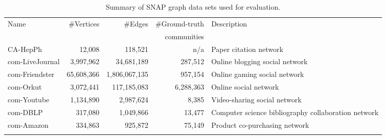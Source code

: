 \begin{table*}
  \centering
  \begin{tabular}{l r r r l}
    Name            & \#Vertices &       \#Edges & \#Ground-truth & Description \\
                    &            &               & communities    &             \\
    \hline
    CA-HepPh        &    12,008  &    118,521    & n/a            & Paper citation network \\
    com-LiveJournal &  3,997,962 &    34,681,189 & 287,512        & Online blogging social network \\
    com-Friendster  & 65,608,366 & 1,806,067,135 & 957,154        & Online gaming social network \\
    com-Orkut       &  3,072,441 &   117,185,083 & 6,288,363      & Online social network \\
    com-Youtube     &  1,134,890 &     2,987,624 & 8,385          & Video-sharing social network \\
    com-DBLP        &    317,080 &     1,049,866 & 13,477         & Computer science bibliography collaboration network \\
    com-Amazon      &    334,863 &       925,872 & 75,149         & Product co-purchasing network \\
    \hline
    \\[-1ex]
  \end{tabular}
  \caption{Summary of SNAP graph data sets used for evaluation.}
  \label{table-snap}
\end{table*}





